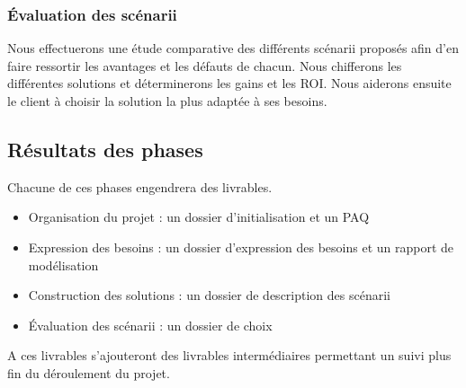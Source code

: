 \subsubsection*{\'Evaluation des sc\'enarii}

Nous effectuerons une \'etude comparative des diff\'erents sc\'enarii propos\'es afin d'en faire ressortir les avantages et les d\'efauts de chacun.
Nous chifferons les diff\'erentes solutions et d\'eterminerons les gains et les ROI.
Nous aiderons ensuite le client \`a choisir la solution la plus adapt\'ee \`a ses besoins.


\subsection*{R\'esultats des phases}

Chacune de ces phases engendrera des livrables.

\begin{itemize}
 \item Organisation du projet : un dossier d'initialisation et un PAQ
 \item Expression des besoins : un dossier d'expression des besoins et un rapport de mod\'elisation
 \item Construction des solutions : un dossier de description des sc\'enarii
 \item \'Evaluation des sc\'enarii : un dossier de choix
\end{itemize}

A ces livrables s'ajouteront des livrables interm\'ediaires permettant un suivi plus fin du d\'eroulement du projet.
